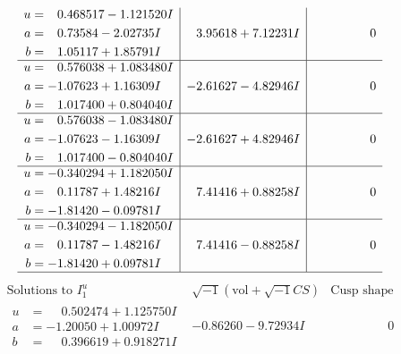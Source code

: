 \documentclass[1p]{elsarticle_modified}
\theoremstyle{definition}
\newcommand{\I}{\sqrt{-1}}
\begin{document}
$$\begin{array}{c|c|c}
\begin{aligned}
u &= \phantom{-}0.468517 - 1.121520 I \\
a &= \phantom{-}0.73584 - 2.02735 I \\
b &= \phantom{-}1.05117 + 1.85791 I\end{aligned}
 & \phantom{-}3.95618 + 7.12231 I & \phantom{-0.000000 } 0 \\ \hline\begin{aligned}
u &= \phantom{-}0.576038 + 1.083480 I \\
a &= -1.07623 + 1.16309 I \\
b &= \phantom{-}1.017400 + 0.804040 I\end{aligned}
 & -2.61627 - 4.82946 I & \phantom{-0.000000 } 0 \\ \hline\begin{aligned}
u &= \phantom{-}0.576038 - 1.083480 I \\
a &= -1.07623 - 1.16309 I \\
b &= \phantom{-}1.017400 - 0.804040 I\end{aligned}
 & -2.61627 + 4.82946 I & \phantom{-0.000000 } 0 \\ \hline\begin{aligned}
u &= -0.340294 + 1.182050 I \\
a &= \phantom{-}0.11787 + 1.48216 I \\
b &= -1.81420 - 0.09781 I\end{aligned}
 & \phantom{-}7.41416 + 0.88258 I & \phantom{-0.000000 } 0 \\ \hline\begin{aligned}
u &= -0.340294 - 1.182050 I \\
a &= \phantom{-}0.11787 - 1.48216 I \\
b &= -1.81420 + 0.09781 I\end{aligned}
 & \phantom{-}7.41416 - 0.88258 I & \phantom{-0.000000 } 0\\
 \hline 
 \end{array}$$\newpage$$\begin{array}{c|c|c}  
\text{Solutions to }I^u_{1}& \I (\text{vol} + \sqrt{-1}CS) & \text{Cusp shape}\\
 \hline 
\begin{aligned}
u &= \phantom{-}0.502474 + 1.125750 I \\
a &= -1.20050 + 1.00972 I \\
b &= \phantom{-}0.396619 + 0.918271 I\end{aligned}
 & -0.86260 - 9.72934 I & \phantom{-0.000000 } 0 \\ \hline\begin{aligned}

\end{aligned}
\end{array}$$
\end{document}
